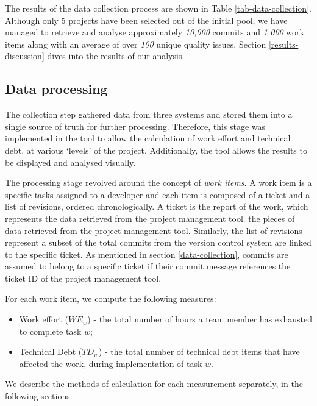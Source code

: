 \documentclass{mpaper}
\begin{document}
The results of the data collection process are shown in Table
\ref{tab-data-collection}. Although only 5 projects have been selected out of
the initial pool, we have managed to retrieve and analyse approximately
\emph{10,000} commits and \emph{1,000} work items along with an average of over
\emph{100} unique quality issues. Section \ref{results-discussion} dives into
the results of our analysis. 

\subsection{Data processing}
\label{data-processing}

The collection step gathered data from three systems and stored them into a
single source of truth for further processing. Therefore, this stage was
implemented in the tool to allow the calculation of work effort and technical
debt, at various `levels' of the project. Additionally, the tool allows the
results to be displayed and analysed visually.

The processing stage revolved around the concept of \emph{work items}. A work
item is a specific tasks assigned to a developer and each item is composed of a
ticket and a list of revisions, ordered chronologically. A ticket is the report
of the work, which represents the data retrieved from the project management
tool. the pieces of data retrieved from the project management tool. Similarly,
the list of revisions represent a subset of the total commits from the version
control system are linked to the specific ticket. As mentioned in section
\ref{data-collection}, commits are assumed to belong to a specific ticket if
their commit message references the ticket ID of the project management tool.

For each work item, we compute the following measures:
\begin{itemize}
  \item Work effort ($WE_{w}$) - the total number of hours a team member has
  exhausted to complete task $w$;
  \item Technical Debt ($TD_{w}$) - the total number of technical debt items
  that have affected the work, during implementation of task $w$.
\end{itemize}

We describe the methods of calculation for each measurement separately, in the
following sections. 
\end{document}
